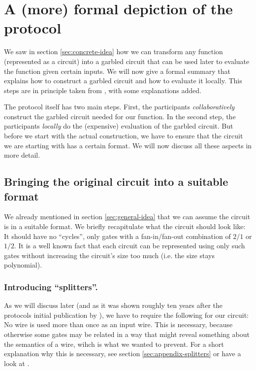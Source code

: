 \section{A (more) formal depiction of the protocol}
\label{sec:formal-description}

We saw in section \ref{sec:concrete-idea} how we can transform any function (represented as a circuit) into a garbled circuit that can be used later to evaluate the function given certain inputs. We will now give a formal summary that explains how to construct a garbled circuit and how to evaluate it locally. This steps are in principle taken from \cite{Rogaway:1991:RCS:888502}, with some explanations added. 

The protocol itself has two main steps. First, the participants \emph{collaboratively} construct the garbled circuit needed for our function. In the second step, the participants \emph{locally} do the (expensive) evaluation of the garbled circuit. But before we start with the actual construction, we have to ensure that the circuit we are starting with has a certain format. We will now discuss all these aspects in more detail.

\subsection{Bringing the original circuit into a suitable format}
\label{sec:original-circuit-suitable-format}

We already mentioned in section \ref{sec:general-idea} that we can assume the circuit is in a suitable format. We briefly recapitulate what the circuit should look like: It should have no ``cycles'', only gates with a fan-in/fan-out combination of $2/1$ or $1/2$. It is a well known fact that each circuit can be represented using only such gates without increasing the circuit's size too much (i.e. the size stays polynomial).

\subsubsection{Introducing ``splitters''.}
\label{sec:introducing-splitters}

As we will discuss later (and as it was shown roughly ten years after the protocols initial publication by \cite{Tate03ongarbled}), we have to require the following for our circuit: No wire is used more than once as an input wire. This is necessary, because otherwise some gates may be related in a way that might reveal something about the semantics of a wire, wihch is what we wanted to prevent. For a short explanation why this is necessary, see section \ref{sec:appendix-splitters} or have a look at \cite{Tate03ongarbled}.

